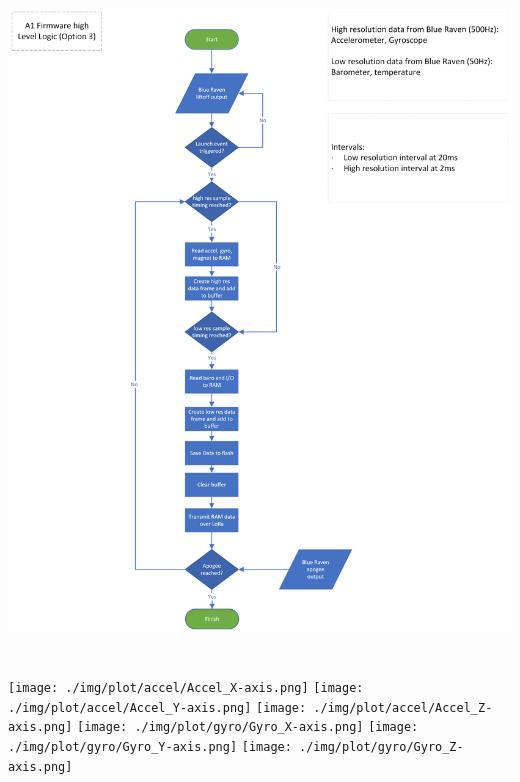 \renewcommand{\thechapter}{\Alph{chapter}}
\renewcommand{\thefigure}{\Alph{chapter}.\arabic{figure}}
\renewcommand{\chaptername}{Appendix}

\setlength{\beforechapskip}{0pt}
\setlength{\afterchapskip}{0pt}
\setlength{\footskip}{5cm}
\setlrmarginsandblock{0.5cm}{0.5cm}{*}
\setulmarginsandblock{0.25cm}{0.25cm}{*}
\clearpage
\checkandfixthelayout
\chapter{}\label{apdx:A}
\begin{minipage}{\textwidth}
  \centering
  \includegraphics[height=0.85\textheight]{./img/A1_high-level.png}
\end{minipage}

\clearpage
\chapter{}\label{apdx:B}
\vfill{}
\begin{minipage}{\textwidth}
\centering\texttt{[image: ./img/plot/accel/Accel\_X-axis.png]}
\centering\texttt{[image: ./img/plot/accel/Accel\_Y-axis.png]}
\centering\texttt{[image: ./img/plot/accel/Accel\_Z-axis.png]}
\centering\texttt{[image: ./img/plot/gyro/Gyro\_X-axis.png]}
\centering\texttt{[image: ./img/plot/gyro/Gyro\_Y-axis.png]}
\centering\texttt{[image: ./img/plot/gyro/Gyro\_Z-axis.png]}
\end{minipage}
\vfill{}

